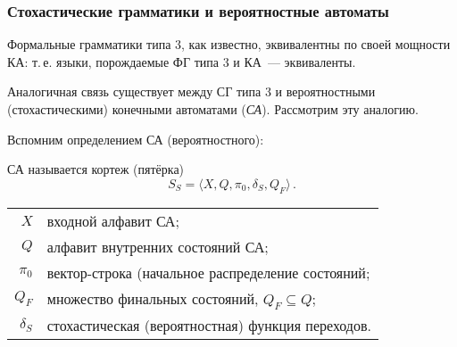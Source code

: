 \subsubsection{Стохастические грамматики и вероятностные автоматы}

Формальные грамматики типа 3, как известно, эквивалентны по своей
мощности КА: т.\,е. языки, порождаемые ФГ типа 3 и КА~--- эквиваленты.

Аналогичная связь существует между СГ типа 3 и вероятностными
(стохастическими) конечными автоматами (\emph{СА}). Рассмотрим эту
аналогию.

Вспомним определением СА (вероятностного):
\begin{defin}
  СА называется кортеж (пятёрка)
  $$
  S_S = \langle X, Q, \pi_0, \delta_S, Q_F \rangle\,.
  $$
  
  \begin{tabular}[t]{r@{\;---\;}p{}@{}}
    $X$ & входной алфавит СА;\\
    $Q$ & алфавит внутренних состояний СА;\\
    $\pi_0$ & вектор-строка (начальное распределение состояний;\\
    $Q_F$ & множество финальных состояний, $Q_F \subseteq Q$;\\
    $\delta_S$ & стохастическая (вероятностная) функция переходов.\\
  \end{tabular}
\end{defin}

